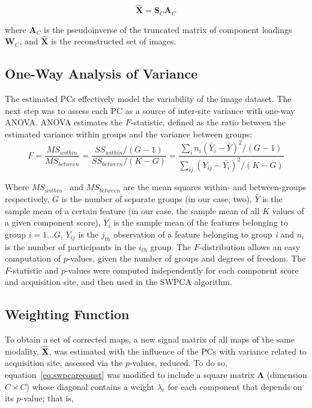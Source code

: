 \begin{equation}\label{eq:swpcareconst}
	\hat{\mathbf{X}}=\mathbf{S}_C \mathbf{A}_C
\end{equation}

where  $\mathbf{A}_C$ is the pseudoinverse of the truncated matrix of
component loadings  $\mathbf{W}_C$, and  $\hat{\mathbf{X}}$ is the
reconstructed set of images.

\subsection{One-Way Analysis of Variance}
The estimated PCs effectively model the variability of the image dataset. The next step was to assess each PC as a source of inter-site variance with one-way \acf{ANOVA}. \ac{ANOVA} estimates the $F$-statistic, defined as the ratio between the estimated variance within groups and the variance between groups:
\begin{equation}
F=\frac{M{S}_{\mathit{within}}}{M{S}_{\mathit{between}}}=\frac{S{S}_{\mathit{within}}/(G-1)}{S{S}_{\mathit{between}}/(K-G)}=\frac{\sum
	_{i}{{n}_{i}{\left({\bar{{Y}}}_{i}-\bar{{Y}}\right)}^{2}/{\left(G-1\right)}}}{\sum
	_{\mathit{ij}}{{\left({Y}_{\mathit{ij}}-\bar{{{Y}_{i}}}\right)}^{2}/{\left(K-G\right)}}}
\end{equation}

Where  $M{S}_{\mathit{within}}$ \ and  $M{S}_{\mathit{between}}$ are the mean squares within- and between-groups respectively, $G$ is the number of separate groups (in our case, two),  $\bar{Y}$ is the sample mean of a certain feature (in our case, the sample mean of all $K$ values of a given component score),  ${\bar{Y}}_{i}$ is the sample mean of the features belonging to group $i=1\dots G$, ${Y}_{\mathit{ij}}$ is the $j_{th}$ observation of a feature belonging to group \textit{i} and  ${n}_{i}$ is the number of participants in the  $i_{th}$ group. The $F$-distribution allows an easy computation of $p$-values, given the number of groups and degrees of freedom. The $F$-statistic and $p$-values were computed independently for each component score and acquisition site, and then used in the \ac{SWPCA} algorithm.

\subsection{Weighting Function}
To obtain a set of corrected maps, a new signal matrix of all maps of the same modality,  $\widehat{\mathbf{X}}$, was estimated with the influence of the PCs with variance related to acquisition site, assessed via the $p$-values, reduced. To do so, equation~\ref{eq:swpcareconst} was modified to include a square matrix $\boldsymbol\Lambda$ (dimension $C\times C$) whose diagonal contains a weight ${\lambda }_{c}$ for each component that depends on its $p$-value; that is,

